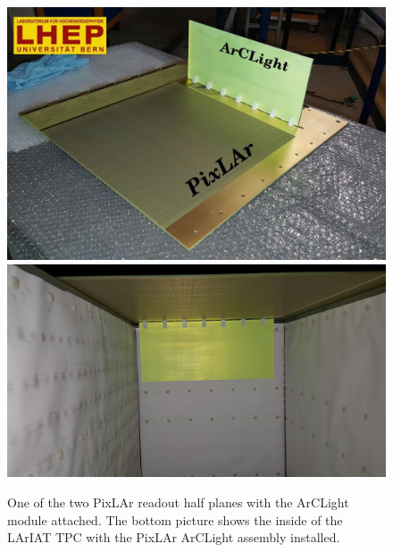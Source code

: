\documentclass[a4paper]{article}
\begin{document}
\begin{figure}[tbp]
	\centering
	\includegraphics[width=\textwidth]{Figures/pixlar_arclight}\\
	\includegraphics[width=\textwidth]{Figures/pixlar_arclight_installed}
	\caption[PixLAr half plane with attached ArCLight module]{%
		One of the two PixLAr readout half planes with the ArCLight module attached.
		The bottom picture shows the inside of the LArIAT TPC with the PixLAr ArCLight assembly installed.
	}
	\label{fig:pixlar_arclight}
\end{figure}
\end{document}
